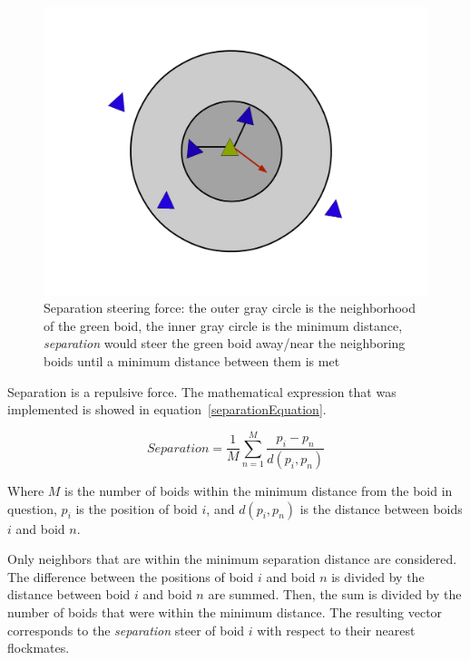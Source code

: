 \begin{figure}[htbp]
\begin{center}
\includegraphics[scale=0.3]{figures/separation.pdf}
\caption{Separation steering force: the outer gray circle is the neighborhood of the green boid, the inner gray circle is the minimum distance, \textit{separation} would steer the green boid away/near the neighboring boids until a minimum distance between them is met}
\label{separationPDF}
\end{center}
\end{figure}

Separation is a repulsive force. The mathematical expression that was implemented is showed in equation~\ref{separationEquation}.

\begin{equation}
\label{separationEquation}
Separation =\frac{1}{M} \sum_{n=1}^{M} \frac{p_i - p_n}{d(p_i,p_n)}
\end{equation}

Where $M$ is the number of boids within the minimum distance from the boid in question, $p_i$ is the position of boid $i$, and $d(p_i,p_n)$ is the distance between boids $i$ and boid $n$.

Only neighbors that are within the minimum separation distance are considered. The difference between the positions of boid $i$ and boid $n$ is divided by the distance between boid $i$ and boid $n$ are summed. Then, the sum is divided by the number of boids that were within the minimum distance. The resulting vector corresponds to the \textit{separation} steer of boid $i$ with respect to their nearest flockmates. 

